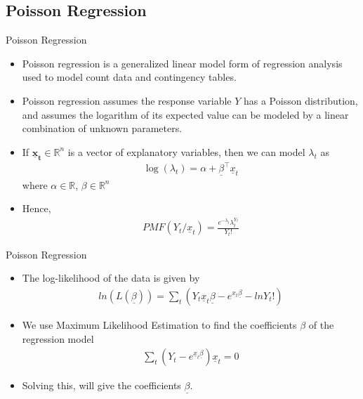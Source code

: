 \documentclass[10pt]{beamer}
\begin{document}
\subsection{Poisson Regression}
\begin{frame}{Poisson Regression}
    \begin{itemize}
        \item Poisson regression is a generalized linear model form of regression analysis used to model count data and contingency tables.
        \item Poisson regression assumes the response variable $Y$ has a Poisson distribution, and assumes the logarithm of its expected value can be modeled by a linear combination of unknown parameters. 
        \item If  $\mathbf {\underline{x}_t} \in \mathbb {R} ^{n}$ is a vector of explanatory variables, then we can model $\lambda_t$ as
        \begin{align}
            \log (\lambda_t) = \alpha + \underline{\beta}^{\top}\underline{x}_{t}
        \end{align}
        where $\alpha \in \mathbb{R}$, $\beta \in \mathbb{R}^{n}$
        \item Hence,
        \begin{align}
            PMF(Y_t/\underline{x}_t)=\frac{e^{-\lambda_t}\lambda_t^{Y_t}}{Y_t!}
        \end{align}
    \end{itemize}
\end{frame}
\begin{frame}{Poisson Regression}
    \begin{itemize}
    \item The log-likelihood of the data is given by 
    \begin{align}
        ln (L(\underline{\beta}))=\displaystyle\sum_{t}(Y_t\underline{x}_t\underline{\beta}-e^{x_t\underline{\beta}}-lnY_t!)
    \end{align}
        \item We use Maximum Likelihood Estimation to find the coefficients $\beta$ of the regression model
        \begin{align}
            \displaystyle\sum_{t}(Y_t-e^{\underline{x}_t\underline{\beta}})\underline{x}_t=0
        \end{align}
        \item Solving this, will give the coefficients $\underline{\beta}$.
    \end{itemize}
\end{frame}
\end{document}
